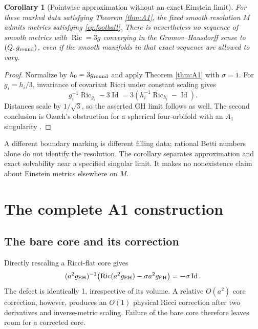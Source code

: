 \documentclass[a4paper,11pt]{article}
\numberwithin{equation}{section}
\newtheorem{corollary}[theorem]{Corollary}
\theoremstyle{definition}
\newcommand{\Ric}{\operatorname{Ric}}
\newcommand{\Id}{\operatorname{Id}}
\begin{document}
\begin{corollary}[Pointwise approximation without an exact Einstein limit]\label{cor:football-separation}
For these marked data satisfying Theorem \ref{thm:A1}, the fixed smooth resolution $M$ admits metrics satisfying \eqref{eq:football}.
There is nevertheless no sequence of smooth metrics with $\Ric=3g$ converging in the Gromov--Hausdorff sense to $(Q,g_{\rm round})$, even if the smooth manifolds in that exact sequence are allowed to vary.
\end{corollary}
\begin{proof}
Normalize by $h_0=3g_{\rm round}$ and apply Theorem \ref{thm:A1} with $\sigma=1$.
For $g_i=h_i/3$, invariance of covariant Ricci under constant scaling gives
\[
g_i^{-1}\Ric_{g_i}-3\Id=3(h_i^{-1}\Ric_{h_i}-\Id).
\]
Distances scale by $1/\sqrt3$, so the asserted GH limit follows as well.
The second conclusion is Ozuch's obstruction for a spherical four-orbifold with an $A_1$ singularity \cite[Theorem 0.9 and Example 0.10]{OzuchIntegrability}.
\end{proof}
A different boundary marking is different filling data; rational Betti numbers alone do not identify the resolution.
The corollary separates approximation and exact solvability near a specified singular limit.
It makes no nonexistence claim about Einstein metrics elsewhere on $M$.

\section{The complete A1 construction}\label{sec:A1-proof}
\subsection{The bare core and its correction}
Directly rescaling a Ricci-flat core gives
\[
(a^2g_{\rm EH})^{-1}\bigl(\Ric(a^2g_{\rm EH})-\sigma a^2g_{\rm EH}\bigr)=-\sigma\Id.
\]
The defect is identically 1, irrespective of its volume. A relative $O(a^2)$ core correction, however, produces an $O(1)$ physical Ricci correction after two derivatives and inverse-metric scaling. Failure of the bare core therefore leaves room for a corrected core.
\end{document}
